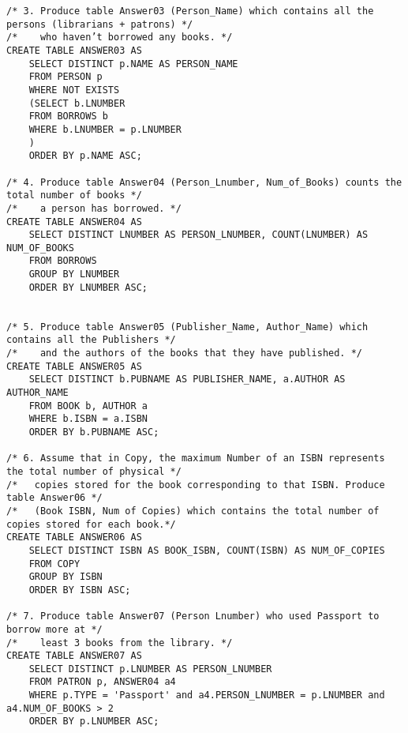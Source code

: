 \documentclass[10pt]{article}
\begin{document}
\begin{verbatim}
/* 3. Produce table Answer03 (Person_Name) which contains all the persons (librarians + patrons) */
/*    who haven’t borrowed any books. */
CREATE TABLE ANSWER03 AS
    SELECT DISTINCT p.NAME AS PERSON_NAME
    FROM PERSON p
    WHERE NOT EXISTS
    (SELECT b.LNUMBER
    FROM BORROWS b
    WHERE b.LNUMBER = p.LNUMBER
    )
    ORDER BY p.NAME ASC;

/* 4. Produce table Answer04 (Person_Lnumber, Num_of_Books) counts the total number of books */
/*    a person has borrowed. */
CREATE TABLE ANSWER04 AS 
    SELECT DISTINCT LNUMBER AS PERSON_LNUMBER, COUNT(LNUMBER) AS NUM_OF_BOOKS
    FROM BORROWS
    GROUP BY LNUMBER
    ORDER BY LNUMBER ASC;
    

/* 5. Produce table Answer05 (Publisher_Name, Author_Name) which contains all the Publishers */
/*    and the authors of the books that they have published. */
CREATE TABLE ANSWER05 AS
    SELECT DISTINCT b.PUBNAME AS PUBLISHER_NAME, a.AUTHOR AS AUTHOR_NAME
    FROM BOOK b, AUTHOR a
    WHERE b.ISBN = a.ISBN
    ORDER BY b.PUBNAME ASC;

/* 6. Assume that in Copy, the maximum Number of an ISBN represents the total number of physical */
/*   copies stored for the book corresponding to that ISBN. Produce table Answer06 */
/*   (Book ISBN, Num of Copies) which contains the total number of copies stored for each book.*/
CREATE TABLE ANSWER06 AS
    SELECT DISTINCT ISBN AS BOOK_ISBN, COUNT(ISBN) AS NUM_OF_COPIES
    FROM COPY
    GROUP BY ISBN
    ORDER BY ISBN ASC;

/* 7. Produce table Answer07 (Person Lnumber) who used Passport to borrow more at */
/*    least 3 books from the library. */
CREATE TABLE ANSWER07 AS
    SELECT DISTINCT p.LNUMBER AS PERSON_LNUMBER
    FROM PATRON p, ANSWER04 a4
    WHERE p.TYPE = 'Passport' and a4.PERSON_LNUMBER = p.LNUMBER and a4.NUM_OF_BOOKS > 2
    ORDER BY p.LNUMBER ASC;
\end{verbatim}
\end{document}
